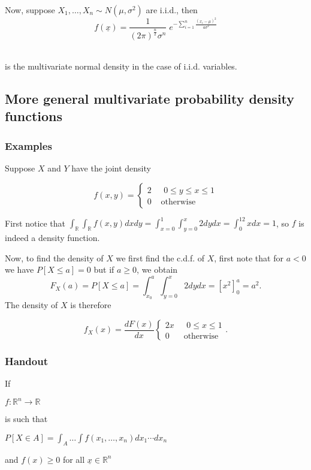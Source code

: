 \documentclass[12pt,a4paper]{article}
\theoremstyle{regla}
\theoremstyle{remark}
\theoremstyle{definition}
\theoremstyle{nonumberbreak}
\begin{document}
Now, suppose $X_1,\ldots,X_n\sim N(\mu,\sigma^2)$ are i.i.d., then\\
$$f(\underline{x})=\frac{1}{(2\pi)^\frac{n}{2}\sigma^n}\; e^{-\displaystyle\sum^{n}_{i=1} \frac{(x_i-\mu)^2}{a\sigma^2}}$$

\\
is the multivariate normal density in the case of i.i.d. variables.


\subsection{More general multivariate probability density functions}
\subsubsection{Examples}
\begin{xmpl}
 Suppose $X$ and $Y$ have the joint density


$$ f(x,y) =
\begin{cases}
2 & \text{   } 0\leq y \leq x \leq 1\\
0 & \text{   otherwise}
\end{cases}$$

First notice that $\int_{\mathbb{R}}\int_{\mathbb{R}}f(x,y)dxdy=\int_{x=0}^1\int_{y=0}^x2dydx=\int_0^12xdx=1$, so $f$ is indeed a density function. 

Now, to find the density of $X$ we first find the c.d.f. of $X$, first note that for $a<0$ we have $P[X\leq a]=0$ but if $a\geq 0$, we obtain
$$F_X(a)=P[X\leq a]=\int_{x_0}^a\int_{y=0}^x2dydx=[x^2]_0^a=a^2.$$
The density of $X$ is therefore

$$ f_X(x) = \frac{dF(x)}{dx}
\begin{cases}
2x & \text{   } 0\leq x \leq 1\\
0 & \text{   otherwise}
\end{cases}.$$
\end{xmpl}

\subsubsection{Handout}
If

$ f: \mathbb{R}^n\rightarrow\mathbb{R}$

is such that

$P[X \in A] = \int_A\ldots\int f(x_1,\ldots, x_n)dx_1\cdots dx_n$

and $f(x)\geq 0$ for all $\underline{x}\in \mathbb{R}^n$
\end{document}

